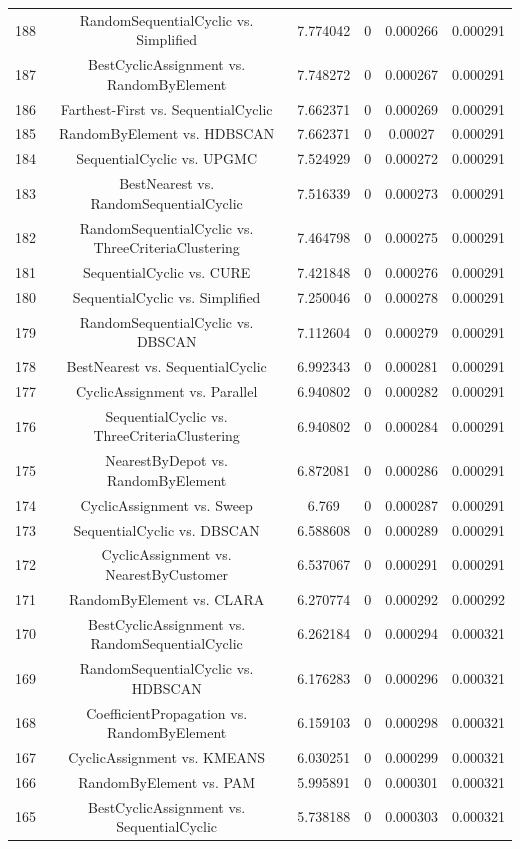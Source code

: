 \documentclass[a4paper,10pt]{article}
\begin{document}
\begin{landscape}
\begin{table}[!htp]
\begin{tabular}{cccccc}
188&RandomSequentialCyclic vs. Simplified&7.774042&0&0.000266&0.000291\\
187&BestCyclicAssignment vs. RandomByElement&7.748272&0&0.000267&0.000291\\
186&Farthest-First vs. SequentialCyclic&7.662371&0&0.000269&0.000291\\
185&RandomByElement vs. HDBSCAN&7.662371&0&0.00027&0.000291\\
184&SequentialCyclic vs. UPGMC&7.524929&0&0.000272&0.000291\\
183&BestNearest vs. RandomSequentialCyclic&7.516339&0&0.000273&0.000291\\
182&RandomSequentialCyclic vs. ThreeCriteriaClustering&7.464798&0&0.000275&0.000291\\
181&SequentialCyclic vs. CURE&7.421848&0&0.000276&0.000291\\
180&SequentialCyclic vs. Simplified&7.250046&0&0.000278&0.000291\\
179&RandomSequentialCyclic vs. DBSCAN&7.112604&0&0.000279&0.000291\\
178&BestNearest vs. SequentialCyclic&6.992343&0&0.000281&0.000291\\
177&CyclicAssignment vs. Parallel&6.940802&0&0.000282&0.000291\\
176&SequentialCyclic vs. ThreeCriteriaClustering&6.940802&0&0.000284&0.000291\\
175&NearestByDepot vs. RandomByElement&6.872081&0&0.000286&0.000291\\
174&CyclicAssignment vs. Sweep&6.769&0&0.000287&0.000291\\
173&SequentialCyclic vs. DBSCAN&6.588608&0&0.000289&0.000291\\
172&CyclicAssignment vs. NearestByCustomer&6.537067&0&0.000291&0.000291\\
171&RandomByElement vs. CLARA&6.270774&0&0.000292&0.000292\\
170&BestCyclicAssignment vs. RandomSequentialCyclic&6.262184&0&0.000294&0.000321\\
169&RandomSequentialCyclic vs. HDBSCAN&6.176283&0&0.000296&0.000321\\
168&CoefficientPropagation vs. RandomByElement&6.159103&0&0.000298&0.000321\\
167&CyclicAssignment vs. KMEANS&6.030251&0&0.000299&0.000321\\
166&RandomByElement vs. PAM&5.995891&0&0.000301&0.000321\\
165&BestCyclicAssignment vs. SequentialCyclic&5.738188&0&0.000303&0.000321\\

\end{tabular}
\end{table}
\end{landscape}
\end{document}
